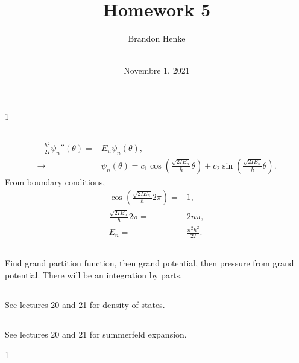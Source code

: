 \documentclass[a4paper,12pt,twoside]{article}
\title{Homework 5}
\author{
	Brandon Henke\\
	\textit{\course}\\
	\textit{\professor}
}
\date{Novembre 1, 2021}
\newcommand{\mcols}{0}
\begin{document}

\maketitle
\if\mcols1
\begin{multicols*}{2}
\fi

\setcounter{section}{5}
\subsection{}
\subsubsection{}
\begin{align}
	-\frac{\hbar^2}{2I}\psi_n''(\theta) =& E_n \psi_n(\theta),\\
	\rightarrow& \psi_n(\theta) = c_1 \cos(\frac{\sqrt{2IE_n}}{\hbar}\theta) + c_2 \sin(\frac{\sqrt{2IE_n}}{\hbar}\theta).
\end{align}
From boundary conditions,
\begin{align}
	\cos(\frac{\sqrt{2IE_n}}{\hbar}2\pi) =& 1,\\
	\frac{\sqrt{2IE_n}}{\hbar}2\pi =& 2n\pi,\\
	E_n =& \frac{n^2\hbar^2}{2I}.
\end{align}
\subsubsection{}


\subsection{}
Find grand partition function, then grand potential, then pressure from grand potential.
There will be an integration by parts.
\subsection{}
See lectures 20 and 21 for density of states.
\subsection{}
See lectures 20 and 21 for summerfeld expansion.


\printBib


\if\mcols1
\end{multicols*}
\fi
\end{document}
